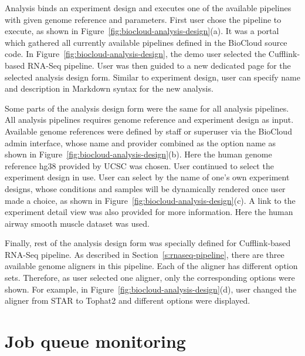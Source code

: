 

Analysis binds an experiment design and executes one of the available pipelines
with given genome reference and parameters. First user chose the pipeline to
execute, as shown in Figure~\ref{fig:biocloud-analysis-design}(a). It was a
portal which gathered all currently available pipelines defined in the BioCloud
source code. In Figure~\ref{fig:biocloud-analysis-design}, the demo user
selected the Cufflink-based RNA-Seq pipeline. User was then guided to a new
dedicated page for the selected analysis design form. Similar to experiment
design, user can specify name and description in Markdown syntax for the
new analysis.

Some parts of the analysis design form were the same for all analysis
pipelines. All analysis pipelines requires genome reference and experiment
design as input. Available genome references were defined by staff or superuser
via the BioCloud admin interface, whose name and provider combined as the
option name as shown in Figure~\ref{fig:biocloud-analysis-design}(b). Here the
human genome reference hg38 provided by UCSC was chosen. User continued to
select the experiment design in use. User can select by the name of one's own
experiment designs, whose conditions and samples will be dynamically rendered
once user made a choice, as shown in
Figure~\ref{fig:biocloud-analysis-design}(c). A link to the experiment detail
view was also provided for more information. Here the human airway smooth
muscle dataset was used.

Finally, rest of the analysis design form was specially defined for
Cufflink-based RNA-Seq pipeline. As described in
Section~\ref{s:rnaseq-pipeline}, there are three available genome aligners in
this pipeline. Each of the aligner has different option sets. Therefore, as
user selected one aligner, only the corresponding options were shown. For
example, in Figure~\ref{fig:biocloud-analysis-design}(d), user changed the
aligner from STAR to Tophat2 and different options were displayed.



\section{Job queue monitoring}




